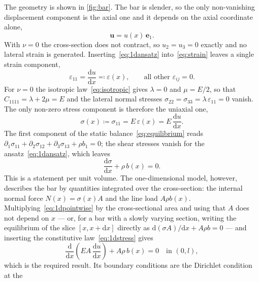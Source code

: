 \documentclass[11pt,a4paper]{article}
\numberwithin{equation}{section}
\theoremstyle{remark}
\newcommand{\bu}{\bm{u}}
\begin{document}
The geometry is shown in \cref{fig:bar}. The bar is slender, so the only non-vanishing
displacement component is the axial one and it depends on the axial coordinate alone,
\begin{equation}\label{eq:1dansatz}
  \bu = u(x)\,\bm{e}_1.
\end{equation}
With $\nu = 0$ the cross-section does not contract, so $u_2 = u_3 = 0$ exactly and no
lateral strain is generated. Inserting~\eqref{eq:1dansatz} into~\eqref{eq:strain} leaves a
single strain component,
\begin{equation}\label{eq:1dstrain}
  \varepsilon_{11} = \frac{\mathrm{d}u}{\mathrm{d}x} \eqqcolon \varepsilon(x),
  \qquad \text{all other } \varepsilon_{ij} = 0.
\end{equation}
For $\nu = 0$ the isotropic law~\eqref{eq:isotropic} gives $\lambda = 0$ and
$\mu = E/2$, so that $C_{1111} = \lambda + 2\mu = E$ and the lateral normal stresses
$\sigma_{22} = \sigma_{33} = \lambda\,\varepsilon_{11} = 0$ vanish. The only non-zero
stress component is therefore the uniaxial one,
\begin{equation}\label{eq:1dstress}
  \sigma(x) \coloneqq \sigma_{11} = E\,\varepsilon(x) = E\,\frac{\mathrm{d}u}{\mathrm{d}x}.
\end{equation}
The first component of the static balance~\eqref{eq:equilibrium} reads
$\partial_1\sigma_{11} + \partial_2\sigma_{12} + \partial_3\sigma_{13} + \rho b_1 = 0$;
the shear stresses vanish for the ansatz~\eqref{eq:1dansatz}, which leaves
\begin{equation}\label{eq:1dpointwise}
  \frac{\mathrm{d}\sigma}{\mathrm{d}x} + \rho\,b(x) = 0.
\end{equation}
This is a statement per unit volume. The one-dimensional model, however, describes the
bar by quantities integrated over the cross-section: the internal normal force
$N(x) = \sigma(x)A$ and the line load $A\rho b(x)$. Multiplying~\eqref{eq:1dpointwise} by
the cross-sectional area and using that $A$ does not depend on $x$ --- or, for a bar with
a slowly varying section, writing the equilibrium of the slice $[x, x+\mathrm{d}x]$
directly as $\mathrm{d}(\sigma A)/\mathrm{d}x + A\rho b = 0$ --- and inserting the
constitutive law~\eqref{eq:1dstress} gives
\begin{equation}\label{eq:barode}
  \boxed{\;\frac{\mathrm{d}}{\mathrm{d}x}\!\left(EA\,\frac{\mathrm{d}u}{\mathrm{d}x}\right)
    + A\rho\,b(x) = 0 \quad\text{in } (0,l),\;}
\end{equation}
which is the required result. Its boundary conditions are the Dirichlet condition at the
\end{document}
